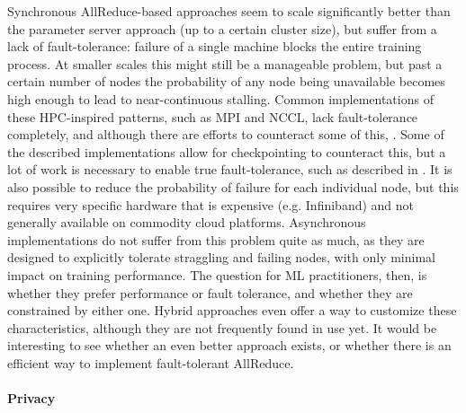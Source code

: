 Synchronous AllReduce-based approaches seem to scale significantly better than the parameter server approach (up to a certain cluster size), but suffer from a lack of fault-tolerance: failure of a single machine blocks the entire training process. At smaller scales this might still be a manageable problem, but past a certain number of nodes the probability of any node being unavailable becomes high enough to lead to near-continuous stalling. Common implementations of these HPC-inspired patterns, such as MPI and NCCL, lack fault-tolerance completely, and although there are efforts to counteract some of this, . Some of the described implementations allow for checkpointing to counteract this, but a lot of work is necessary to enable true fault-tolerance, such as described in \citet{Amatya2017}. It is also possible to reduce the probability of failure for each individual node, but this requires very specific hardware that is expensive (e.g. Infiniband) and not generally available on commodity cloud platforms.
Asynchronous implementations do not suffer from this problem quite as much, as they are designed to explicitly tolerate straggling and failing nodes, with only minimal impact on training performance. The question for ML practitioners, then, is whether they prefer performance or fault tolerance, and whether they are constrained by either one. Hybrid approaches even offer a way to customize these characteristics, although they are not frequently found in use yet. It would be interesting to see whether an even better approach exists, or whether there is an efficient way to implement fault-tolerant AllReduce.

\paragraph{Privacy}

